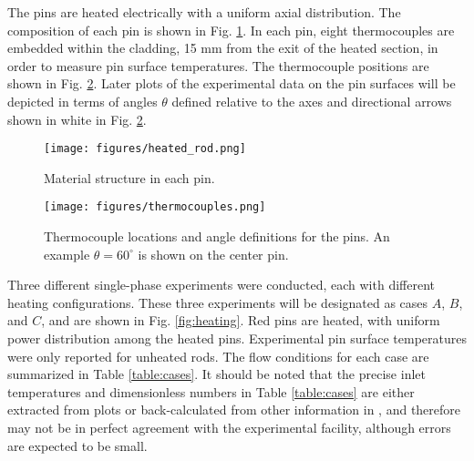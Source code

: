\documentclass[3p,,preprint,11pt]{elsarticle}
\begin{document}
The pins are heated electrically with a uniform axial distribution. The composition of each pin is shown in Fig. \ref{fig:heated_pin}.
In each pin, eight thermocouples are embedded within the cladding, 15 \si{\milli\meter} from the exit of the heated section, in order to measure pin surface temperatures. The thermocouple positions are shown in Fig. \ref{fig:thermocouples}. %
Later plots of the experimental data on the pin surfaces will be depicted in terms of angles $\theta$ defined relative to the axes and directional arrows shown in white in Fig. \ref{fig:thermocouples}. 

\begin{figure}[!htb]                                                                                                  
\centering
\texttt{[image: figures/heated\_rod.png]}
\caption{Material structure in each pin.}
\label{fig:heated_pin}
\end{figure}

\begin{figure}[!htb]                                                                                                  
\centering
\texttt{[image: figures/thermocouples.png]}
\caption{Thermocouple locations and angle definitions for the pins. An example $\theta=60^\circ$ is shown on the center pin.}
\label{fig:thermocouples}
\end{figure}


Three different single-phase experiments were conducted, each with different heating configurations. These three experiments will be designated as cases $A$, $B$, and $C$, and are shown in Fig. \ref{fig:heating}. Red pins are heated, with uniform power distribution among the heated pins. Experimental pin surface temperatures were only reported for unheated rods.%
The flow conditions for each case are summarized in Table \ref{table:cases}. It should be noted that the precise inlet temperatures and dimensionless numbers in Table \ref{table:cases} are either extracted from plots or back-calculated from other information in \cite{cheng2009}, and therefore may not be in perfect agreement with the experimental facility, although errors are expected to be small.
\end{document}
